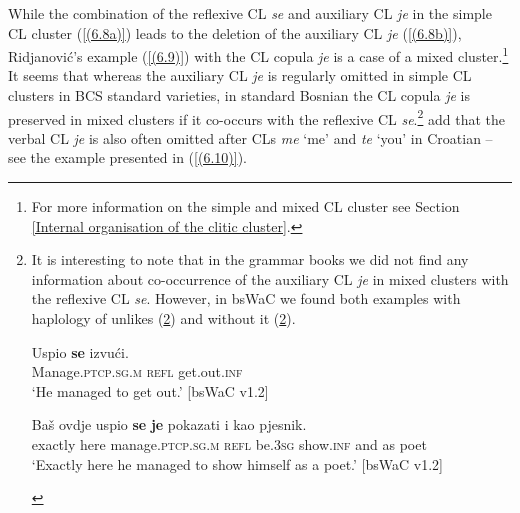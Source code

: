 \noindent While the combination of the reflexive CL \textit{se} and auxiliary CL \textit{je} in the simple CL cluster (\ref{(6.8a)}) leads to the deletion of the auxiliary CL \textit{je} (\ref{(6.8b)}), Ridjanović’s example (\ref{(6.9)}) with the CL copula \textit{je} is a case of a mixed cluster.\footnote{For more information on the simple and mixed CL cluster see Section \ref{Internal organisation of the clitic cluster}.} It seems that whereas the auxiliary CL \textit{je} is regularly omitted in simple CL clusters in BCS standard varieties, in standard Bosnian the CL copula \textit{je} is preserved in mixed clusters if it co-occurs with the reflexive CL \textit{se}.\footnote{It is interesting to note that in the grammar books we did not find any information about co-occurrence of the auxiliary CL \textit{je} in mixed clusters with the reflexive CL \textit{se}. However, in bsWaC we found both examples with haplology of unlikes (\ref{14102021a}) and without it (\ref{14102021b}). 

\begin{exe}\ex\label{14102021a}
\gll Uspio \textbf{se} izvući. \\
 Manage\textsc{.ptcp.sg.m} \textsc{refl} get.out\textsc{.inf} \\
\glt ‘He managed to get out.’ 
\hfill [bsWaC v1.2]

\ex\label{14102021b}
\gll Baš ovdje uspio \textbf{se} \textbf{je} pokazati i kao pjesnik. \\
 exactly here manage\textsc{.ptcp.sg.m} \textsc{refl} be\textsc{.3sg} show.\textsc{inf} and as poet \\
\glt ‘Exactly here he managed to show himself as a poet.’
\hfill [bsWaC v1.2]
\end{exe}}
\citet[246]{TezakBabic96} add that the verbal CL \textit{je} is also often omitted after CLs \textit{me} ‘me’ and \textit{te} ‘you’ in Croatian – see the example presented in (\ref{(6.10)}).


